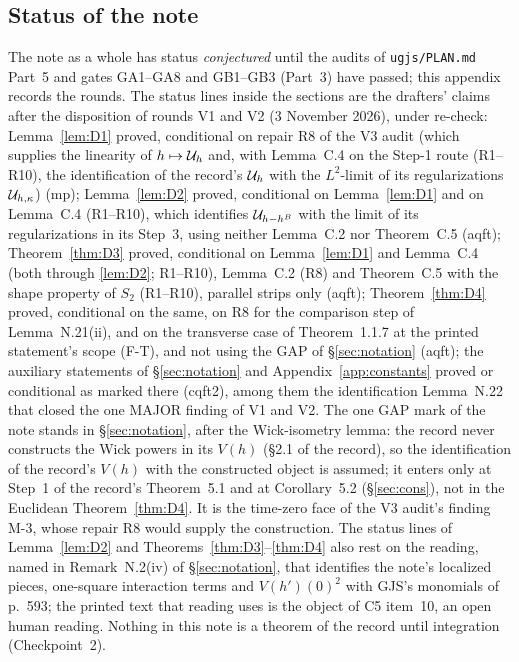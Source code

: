\subsection*{Status of the note}
The note as a whole has status \emph{conjectured} until the audits of \texttt{ugjs/PLAN.md}
Part~5 and gates GA1--GA8 and GB1--GB3 (Part~3) have passed; this appendix records the rounds.
The status lines inside the sections are the drafters' claims after the disposition of rounds V1
and V2 (3 November 2026), under re-check: Lemma~\ref{lem:D1} proved, conditional on repair R8 of
the V3 audit (which supplies the linearity of $h\mapsto\mathcal U_h$ and, with Lemma~C.4 on the
Step-1 route (R1--R10), the identification of the record's $\mathcal U_h$ with the $L^2$-limit of its
regularizations $\mathcal U_{h,\kappa}$) (mp); Lemma~\ref{lem:D2} proved, conditional on Lemma~\ref{lem:D1} and on Lemma~C.4 (R1--R10), which
identifies $\mathcal U_{h-h^B}$ with the limit of its regularizations in its Step~3, using neither
Lemma~C.2 nor Theorem~C.5 (aqft); Theorem~\ref{thm:D3} proved, conditional on
Lemma~\ref{lem:D1} and Lemma~C.4 (both through \ref{lem:D2}; R1--R10), Lemma~C.2 (R8) and
Theorem~C.5 with the shape property of $S_2$ (R1--R10), parallel strips only (aqft); Theorem~\ref{thm:D4} proved,
conditional on the same, on R8 for the comparison step of Lemma~N.21(ii), and on the transverse
case of Theorem~1.1.7 at the printed statement's scope (F-T), and not using the GAP of
\S\ref{sec:notation} (aqft); the auxiliary statements of \S\ref{sec:notation} and
Appendix~\ref{app:constants} proved or conditional as marked there (cqft2), among them the
identification Lemma~N.22 that closed the one MAJOR finding of V1 and V2. The one GAP mark of the
note stands in \S\ref{sec:notation}, after the Wick-isometry lemma: the record never constructs
the Wick powers in its $V(h)$ (\S2.1 of the record), so the identification of the record's
$V(h)$ with the constructed object is assumed; it enters only at Step~1 of the record's
Theorem~5.1 and at Corollary~5.2 (\S\ref{sec:cons}), not in the Euclidean Theorem~\ref{thm:D4}.
It is the time-zero face of the V3 audit's finding M-3, whose repair R8 would supply the
construction. The status lines of Lemma~\ref{lem:D2} and Theorems~\ref{thm:D3}--\ref{thm:D4} also rest on
the reading, named in Remark~N.2(iv) of \S\ref{sec:notation}, that identifies the note's
localized pieces, one-square interaction terms and $V(h')(0)^2$ with GJS's monomials of
p.~593; the printed text that reading uses is the object of C5 item~10, an open human reading. Nothing in this note is a theorem of the record
until integration (Checkpoint~2).

